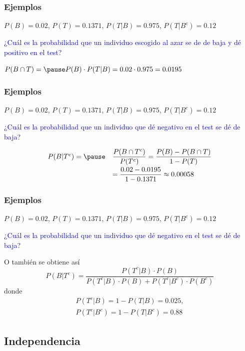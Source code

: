 \documentclass[handout]{beamer}\usepackage[]{graphicx}\usepackage[]{color}
\newcommand{\blue}[1]{\textcolor{blue}{#1}}
\theoremstyle{plain}
\theoremstyle{definition}
\begin{document}
\begin{frame}
\frametitle{Ejemplos}  

$P(B)=0.02$, $P(T)=0.1371$, $P(T|B)=0.975$, $P(T|B^c)=0.12$
\medskip

\blue{¿Cuál  es la probabilidad que un individuo escogido al azar se de de  baja y dé positivo en el test?}
\bigskip

$P(B\cap T)=\pause P(B)\cdot P(T|B)=0.02\cdot 0.975=0.0195$


\end{frame}


\begin{frame}
\frametitle{Ejemplos}  

$P(B)=0.02$, $P(T)=0.1371$, $P(T|B)=0.975$, $P(T|B^c)=0.12$

\medskip
\blue{¿Cuál  es la probabilidad que un individuo  que dé negativo en el test se dé de baja?}

$$
\begin{array}{rl}
P(B|T^c)=\pause &\displaystyle \frac{P(B\cap T^c)}{P(T^c)}=
\frac{P(B)-P(B\cap T)}{1-P(T)}\\[2ex] & \displaystyle =
\frac{0.02-0.0195}{1-0.1371}\approx 0.00058
\end{array}
$$

\end{frame}


\begin{frame}
\frametitle{Ejemplos}  

$P(B)=0.02$, $P(T)=0.1371$, $P(T|B)=0.975$, $P(T|B^c)=0.12$
\medskip


\blue{¿Cuál  es la probabilidad que un individuo  que dé negativo en el test se dé de baja?}
\medskip

O también se obtiene  así
$$
P(B|T^c)=\frac{P(T^c|B)\cdot P(B)}{P(T^c|B)\cdot P(B)+P(T^c|B^c)\cdot P(B^c)}
$$
donde
$$
\begin{array}{l}
P(T^c|B)=1-P(T|B)=0.025,\\[1ex] P(T^c|B^c)=1-P(T|B^c)=0.88
\end{array}
$$
\end{frame}


\subsection{Independencia}
\end{document}
